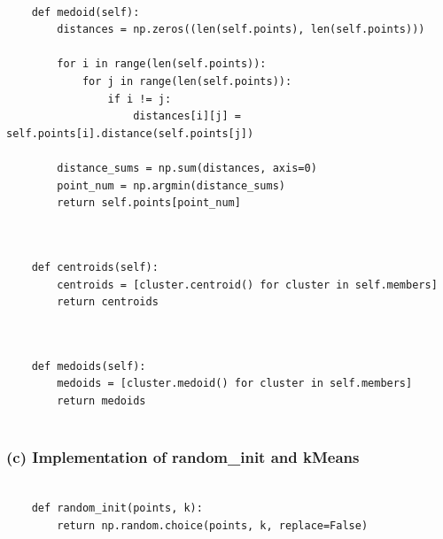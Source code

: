 \documentclass[11pt]{article}
\newcommand{\sol}[1]{{\bf{\color{magenta}{{Solution:}}}}}
\begin{document}
\begin{verbatim}

    def medoid(self):
        distances = np.zeros((len(self.points), len(self.points)))

        for i in range(len(self.points)):
            for j in range(len(self.points)):
                if i != j:
                    distances[i][j] = self.points[i].distance(self.points[j])
                
        distance_sums = np.sum(distances, axis=0)
        point_num = np.argmin(distance_sums)
        return self.points[point_num]     
        
\end{verbatim}

\begin{verbatim}

    def centroids(self):
        centroids = [cluster.centroid() for cluster in self.members]
        return centroids
        
\end{verbatim}

\begin{verbatim}

    def medoids(self):
        medoids = [cluster.medoid() for cluster in self.members]
        return medoids
        
\end{verbatim}

\subsubsection{(c) Implementation of random\_init and kMeans}
\sol{} 
\begin{verbatim}

    def random_init(points, k):
        return np.random.choice(points, k, replace=False)
        
\end{verbatim}
\end{document}
